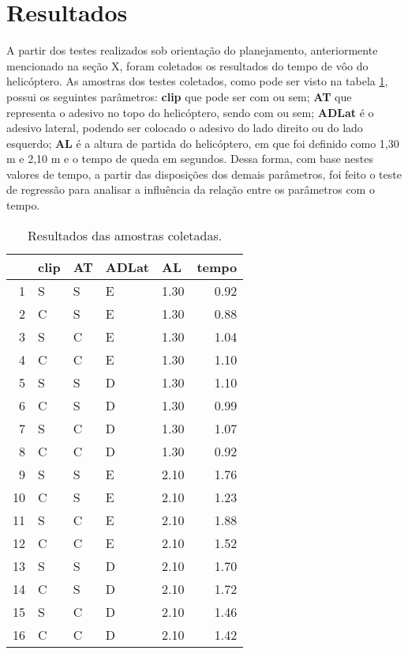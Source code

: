 \section{Resultados}
\label{sec:resultados}

A partir dos testes realizados sob orientação do planejamento, anteriormente mencionado na seção X, foram coletados os resultados do tempo de vôo do helicóptero. As amostras dos testes coletados, como pode ser visto na tabela \ref{tab:amostras}, possui os seguintes parâmetros: \textbf{clip} que pode ser com ou sem; \textbf{AT} que representa o adesivo no topo do helicóptero, sendo com ou sem; \textbf{ADLat} é o adesivo lateral, podendo ser colocado o adesivo do lado direito ou do lado esquerdo; \textbf{AL} é a altura de partida do helicóptero, em que foi definido como 1,30 m e 2,10 m e o tempo de queda em segundos. Dessa forma, com base nestes valores de tempo, a partir das disposições dos demais parâmetros, foi feito o teste de regressão para analisar a influência da relação entre os parâmetros com o tempo.

\begin{table}[ht]
    \centering
    \caption{Resultados das amostras coletadas.}
    \begin{tabular}{rllllr}
      \hline
     & clip & AT & ADLat & AL & tempo \\ 
      \hline
    1 & S & S & E & 1.30 & 0.92 \\ 
      2 & C & S & E & 1.30 & 0.88 \\ 
      3 & S & C & E & 1.30 & 1.04 \\ 
      4 & C & C & E & 1.30 & 1.10 \\ 
      5 & S & S & D & 1.30 & 1.10 \\ 
      6 & C & S & D & 1.30 & 0.99 \\ 
      7 & S & C & D & 1.30 & 1.07 \\ 
      8 & C & C & D & 1.30 & 0.92 \\ 
      9 & S & S & E & 2.10 & 1.76 \\ 
      10 & C & S & E & 2.10 & 1.23 \\ 
      11 & S & C & E & 2.10 & 1.88 \\ 
      12 & C & C & E & 2.10 & 1.52 \\ 
      13 & S & S & D & 2.10 & 1.70 \\ 
      14 & C & S & D & 2.10 & 1.72 \\ 
      15 & S & C & D & 2.10 & 1.46 \\ 
      16 & C & C & D & 2.10 & 1.42 \\ 
       \hline
    \end{tabular}
    \label{tab:amostras}
\end{table}

